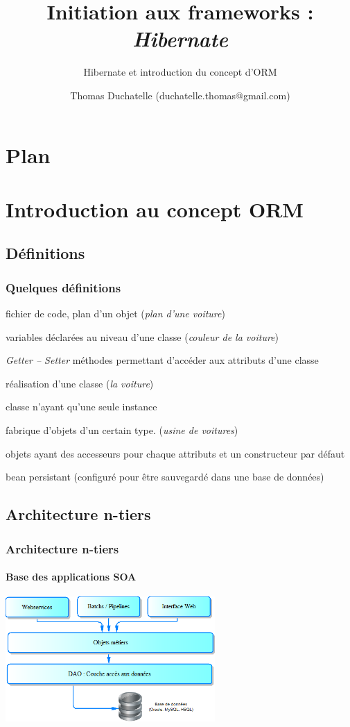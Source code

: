 \documentclass[compact]{beamer}%
\title{Initiation aux frameworks : \emph{Hibernate}}
\subtitle{Hibernate et introduction du concept d'ORM}
\author{Thomas Duchatelle (duchatelle.thomas@gmail.com)}
\institute{Capgemini, pour Yves Rocher}
\begin{document}
\frame{\titlepage}
  
\section*{Plan}
\frame{\tableofcontents[hideallsubsections]}
	
\section{Introduction au concept ORM}
	
\subsection{Définitions}
		
\begin{frame}
	\frametitle{Quelques définitions}
	\begin{description}[<+->]
	\item[Classe] fichier de code, plan d'un objet (\emph{plan d'une voiture})
	\item[Attributs] variables déclarées au niveau d'une classe (\emph{couleur de la voiture})
	\item[Accesseurs] \emph{Getter -- Setter} méthodes permettant d'accéder aux attributs d'une classe
	\item[Instance] réalisation d'une classe (\emph{la voiture})
	\item[singleton] classe n'ayant qu'une seule instance
	\item[Factory] fabrique d'objets d'un certain type. (\emph{usine de voitures}) %
	\item[Bean] objets ayant des accesseurs pour chaque attributs et un constructeur par défaut
	\item[Entité] bean persistant (configuré pour être sauvegardé dans une base de données)
	\end{description}
\end{frame}
	
\subsection{Architecture n-tiers}

\begin{frame}
	\frametitle{Architecture n-tiers}
	\framesubtitle{Base des applications SOA}
	
	\begin{center}	
	\includegraphics[width=8cm]{images/arch_n_tiers_all.png}
	\end{center}
	\end{frame}
\end{document}
